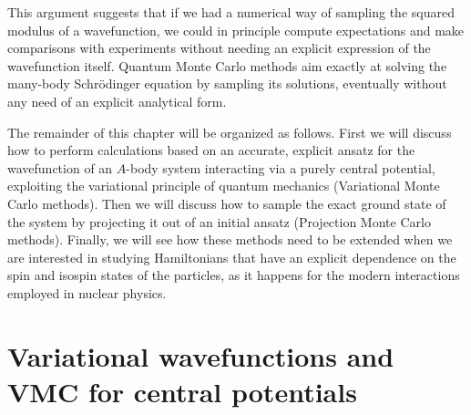 This argument suggests that if we had a numerical way of sampling the squared modulus of a wavefunction, we could in principle compute expectations and make comparisons with experiments
without needing an explicit expression of the wavefunction itself. Quantum Monte Carlo methods
aim exactly at solving the many-body Schr\"odinger equation by sampling its solutions, eventually
without any need of an explicit analytical form.

The remainder of this chapter will be organized as follows. First we will discuss
how to perform calculations based on an accurate, explicit ansatz for the wavefunction of an $A$-body system interacting via a purely central potential, exploiting the variational principle of quantum mechanics (Variational Monte Carlo methods). Then we will discuss how to sample the exact ground state of the system by
projecting it out of an initial ansatz (Projection Monte Carlo methods). Finally, we will
see how these methods need to be extended when we are interested in studying Hamiltonians
that have an explicit dependence on the spin and isospin states of the particles, as it 
happens for the modern interactions employed in nuclear physics.

\section{Variational wavefunctions and VMC for central potentials}



